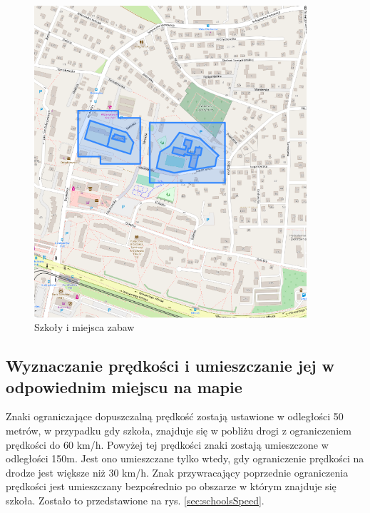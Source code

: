 \begin{figure}[h]
\caption{Szkoły i miejsca zabaw}
\label{sec:schoolBorder}
\centering
\includegraphics[width=0.9\textwidth]{schoolsBorder}
\end{figure}

\newpage
\subsection{Wyznaczanie prędkości i umieszczanie jej w odpowiednim miejscu na mapie}

Znaki ograniczające dopuszczalną prędkość zostają ustawione w odległości 50 metrów, w przypadku gdy szkoła, znajduje się w pobliżu drogi z ograniczeniem prędkości do 60 km/h. Powyżej tej prędkości znaki zostają umieszczone w odległości 150m. Jest ono umieszczane tylko wtedy, gdy ograniczenie prędkości na drodze jest większe niż 30 km/h. Znak przywracający poprzednie ograniczenia prędkości jest umieszczany bezpośrednio po obszarze w którym znajduje się szkoła. Zostało to przedstawione na rys. \ref{sec:schoolsSpeed}.

